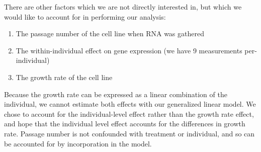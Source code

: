 \begin{itemize}
There are other factors which we are not directly interested in, but which we would like to account for in performing our analysis:

\begin{enumerate}
\item The passage number of the cell line when RNA was gathered
\item The within-individual effect on gene expression (we have 9 measurements per-individual)
\item The growth rate of the cell line
\end{enumerate}

Because the growth rate can be expressed as a linear combination of the individual, we cannot estimate both effects with our generalized linear model.  We chose to account for the individual-level effect rather
than the growth rate effect, and hope that the individual level effect accounts for the differences in growth rate. Passage number is not confounded with treatment or individual, and so can be accounted for by incorporation
in the model.



\end{itemize}
